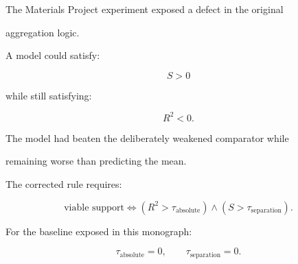 \documentclass[11pt,a4paper,oneside]{report}
\begin{document}
The Materials Project experiment exposed a defect in the original

aggregation logic.



A model could satisfy:



\begin{equation}
S>0
\end{equation}



while still satisfying:



\begin{equation}
R^2<0.
\end{equation}



The model had beaten the deliberately weakened comparator while

remaining worse than predicting the mean.



The corrected rule requires:



\begin{equation}
\label{eq:two-door}
\text{viable support}
\iff
\left(
R^2
>
\tau_{\mathrm{absolute}}
\right)
\land
\left(
S
>
\tau_{\mathrm{separation}}
\right).
\end{equation}



For the baseline exposed in this monograph:



\begin{equation}
\tau_{\mathrm{absolute}}
=
0,
\qquad
\tau_{\mathrm{separation}}
=
0.
\end{equation}
\end{document}
